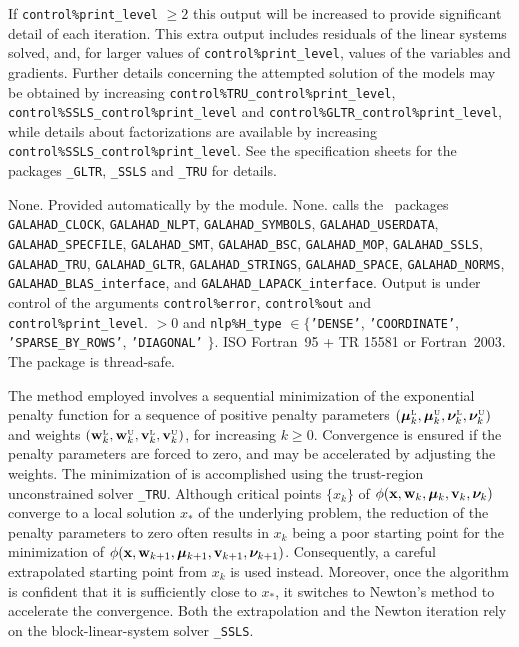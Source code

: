 \documentclass{galahad}
\newcommand{\packagename}{EXPO}
\newcommand{\sL}{\s{L}}
\newcommand{\sU}{\s{U}}
\begin{document}
If {\tt control\%print\_level} $\geq 2$ this
output will be increased to provide significant detail of each iteration.
This extra output includes residuals of the linear systems solved, and,
for larger values of {\tt control\%print\_level}, values of the variables
and gradients. Further details concerning the attempted solution of the models
may be obtained by increasing
{\tt control\%TRU\_control\%print\_level},
{\tt control\%SSLS\_control\%print\_level}
and
{\tt control\%GLTR\_control\%print\-\_level},
while details about factorizations are available
by increasing
{\tt control\%SSLS\_control\%print\_level}.
See the specification sheets for the packages
{\tt \libraryname\_GLTR},
{\tt \libraryname\_SSLS} and
{\tt \libraryname\_TRU}
for details.


\galgeneral

\galcommon None.
\galworkspace Provided automatically by the module.
\galroutines None.
\galmodules {\tt \packagename\_solve} calls the \galahad\ packages
{\tt GALAHAD\_CLOCK},
{\tt GALAHAD\_NLPT},
{\tt GALAHAD\_SY\-M\-BOLS}, \sloppy
{\tt GALAHAD\_USERDATA},
{\tt GALAHAD\_SPECFILE},
{\tt GALAHAD\_SMT},
{\tt GALAHAD\_BSC},
{\tt GALAHAD\_MOP},
{\tt GALAHAD\_SSLS},
{\tt GALAHAD\_TRU},
{\tt GALAHAD\_GLTR},
{\tt GALAHAD\_STRINGS},
{\tt GALAHAD\_SPACE},
{\tt GALAHAD\_\-NORMS},
{\tt GALAHAD\_BLAS\_interface},
and
{\tt GALAHAD\_LAPACK\_interface}.
\galio Output is under control of the arguments
 {\tt control\%error}, {\tt control\%out} and {\tt control\%print\_level}.
 $> 0$ and
{\tt nlp\%H\_type} $\in \{${\tt 'DENSE'},
 {\tt 'COORDINATE'}, {\tt 'SPARSE\_BY\_ROWS'}, {\tt 'DIAGONAL'} $\}$.
\galportability ISO Fortran~95 + TR 15581 or Fortran~2003.
The package is thread-safe.


\galmethod
The method employed involves a sequential minimization of the exponential
penalty function  for a sequence of positive penalty parameters
$(\bmmu\sL_k, \bmmu\sU_k, \bmnu\sL_k, \bmnu\sU_k)$ 
and weights
$(\bmw\sL_k, \bmw\sU_k, \bmv\sL_k, \bmv\sU_k)$,
for increasing $k \geq 0$. Convergence is ensured if the
penalty parameters are forced to zero, and may be accelerated
by adjusting the weights. The minimization of  is 
accomplished using the trust-region unconstrained solver 
{\tt \libraryname\_TRU}. Although critical points $\{x_k\}$ of 
$\phi({\mathbf{x}},{\mathbf{w}}_k,\bm \mu_k,{\mathbf{v}}_k,\bm \nu_k)$ converge to a local solution $x_*$
of the underlying problem, the reduction of the penalty parameters to
zero often results in $x_k$ being a poor starting point for the minimization 
of $\phi({\mathbf{x}},{\mathbf{w}}_{k+1},\bm \mu_{k+1},{\mathbf{v}}_{k+1},\bm \nu_{k+1})$. Consequently, 
a careful extrapolated starting point from $x_k$ is used instead. Moreover,
once the algorithm is confident that it is sufficiently close to $x_*$,
it switches to Newton's method to accelerate the convergence. Both the
extrapolation and the Newton iteration rely on the block-linear-system
solver {\tt \libraryname\_SSLS}.
\vspace*{1mm}
\end{document}
